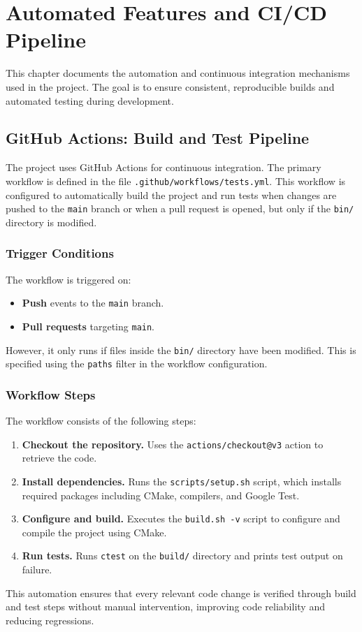 \chapter{Automated Features and CI/CD Pipeline}
\label{ch:ci-cd}
\pagestyle{fancy}

This chapter documents the automation and continuous integration mechanisms used in the project. The goal is to ensure consistent, reproducible builds and automated testing during development.

\section{GitHub Actions: Build and Test Pipeline}
\label{sec:github-actions}

The project uses GitHub Actions for continuous integration. The primary workflow is defined in the file \texttt{.github/workflows/tests.yml}. This workflow is configured to automatically build the project and run tests when changes are pushed to the \texttt{main} branch or when a pull request is opened, but only if the \texttt{bin/} directory is modified.

\subsection*{Trigger Conditions}

The workflow is triggered on:
\begin{itemize}
	\item \textbf{Push} events to the \texttt{main} branch.
	\item \textbf{Pull requests} targeting \texttt{main}.
\end{itemize}
However, it only runs if files inside the \texttt{bin/} directory have been modified. This is specified using the \texttt{paths} filter in the workflow configuration.

\subsection*{Workflow Steps}

The workflow consists of the following steps:
\begin{enumerate}
	\item \textbf{Checkout the repository.} Uses the \texttt{actions/checkout@v3} action to retrieve the code.
	\item \textbf{Install dependencies.} Runs the \texttt{scripts/setup.sh} script, which installs required packages including CMake, compilers, and Google Test.
	\item \textbf{Configure and build.} Executes the \texttt{build.sh -v} script to configure and compile the project using CMake.
	\item \textbf{Run tests.} Runs \texttt{ctest} on the \texttt{build/} directory and prints test output on failure.
\end{enumerate}
This automation ensures that every relevant code change is verified through build and test steps without manual intervention, improving code reliability and reducing regressions.
